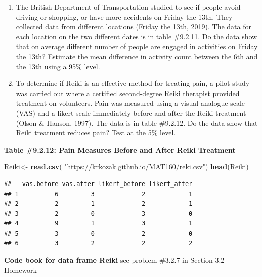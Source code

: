 \documentclass[
]{book}
\newenvironment{Shaded}{\begin{snugshade}}{\end{snugshade}}
\newcommand{\KeywordTok}[1]{\textcolor[rgb]{0.13,0.29,0.53}{\textbf{#1}}}
\newcommand{\NormalTok}[1]{#1}
\newcommand{\StringTok}[1]{\textcolor[rgb]{0.31,0.60,0.02}{#1}}
\begin{document}
\begin{enumerate}
\def\labelenumi{\arabic{enumi}.}
\setcounter{enumi}{5}
\item
  The British Department of Transportation studied to see if people avoid driving or shopping, or have more accidents on Friday the 13th. They collected data from different locations (Friday the 13th, 2019). The data for each location on the two different dates is in table \#9.2.11. Do the data show that on average different number of people are engaged in activities on Friday the 13th? Estimate the mean difference in activity count between the 6th and the 13th using a 95\% level.
\item
  To determine if Reiki is an effective method for treating pain, a pilot study was carried out where a certified second-degree Reiki therapist provided treatment on volunteers. Pain was measured using a visual analogue scale (VAS) and a likert scale immediately before and after the Reiki treatment (Olson \& Hanson, 1997). The data is in table \#9.2.12. Do the data show that Reiki treatment reduces pain? Test at the 5\% level.
\end{enumerate}

\textbf{Table \#9.2.12: Pain Measures Before and After Reiki Treatment}

\begin{Shaded}
\begin{Highlighting}[]
\NormalTok{Reiki<-}\StringTok{ }\KeywordTok{read.csv}\NormalTok{(}
  \StringTok{"https://krkozak.github.io/MAT160/reki.csv"}\NormalTok{)}
\KeywordTok{head}\NormalTok{(Reiki)}
\end{Highlighting}
\end{Shaded}

\begin{verbatim}
##   vas.before vas.after likert_before likert_after
## 1          6         3             2            1
## 2          2         1             2            1
## 3          2         0             3            0
## 4          9         1             3            1
## 5          3         0             2            0
## 6          3         2             2            2
\end{verbatim}

\textbf{Code book for data frame Reiki} see problem \#3.2.7 in Section 3.2 Homework
\end{document}
